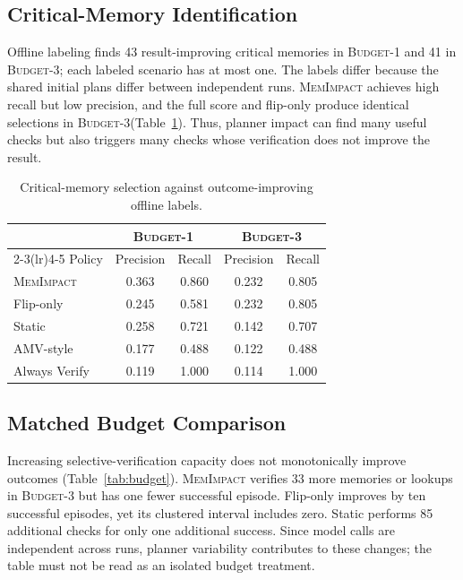 \documentclass[11pt]{article}
\newcommand{\method}{\textsc{MemImpact}\xspace}
\newcommand{\BOne}{\textsc{Budget-1}\xspace}
\newcommand{\BThree}{\textsc{Budget-3}\xspace}
\begin{document}
\subsection{Critical-Memory Identification}

Offline labeling finds 43 result-improving critical memories in \BOne and 41 in \BThree; each labeled scenario has at most one. The labels differ because the shared initial plans differ between independent runs. \method achieves high recall but low precision, and the full score and flip-only produce identical selections in \BThree (Table~\ref{tab:critical}). Thus, planner impact can find many useful checks but also triggers many checks whose verification does not improve the result.

\begin{table}[t]
\centering
\small
\caption{Critical-memory selection against outcome-improving offline labels.}
\label{tab:critical}
\begin{tabular}{lcccc}
\toprule
& \multicolumn{2}{c}{\BOne} & \multicolumn{2}{c}{\BThree} \\
\cmidrule(lr){2-3}\cmidrule(lr){4-5}
Policy & Precision & Recall & Precision & Recall \\
\midrule
\method & 0.363 & 0.860 & 0.232 & 0.805 \\
Flip-only & 0.245 & 0.581 & 0.232 & 0.805 \\
Static & 0.258 & 0.721 & 0.142 & 0.707 \\
AMV-style & 0.177 & 0.488 & 0.122 & 0.488 \\
Always Verify & 0.119 & 1.000 & 0.114 & 1.000 \\
\bottomrule
\end{tabular}
\end{table}

\subsection{Matched Budget Comparison}

Increasing selective-verification capacity does not monotonically improve outcomes (Table~\ref{tab:budget}). \method verifies 33 more memories or lookups in \BThree but has one fewer successful episode. Flip-only improves by ten successful episodes, yet its clustered interval includes zero. Static performs 85 additional checks for only one additional success. Since model calls are independent across runs, planner variability contributes to these changes; the table must not be read as an isolated budget treatment.
\end{document}
